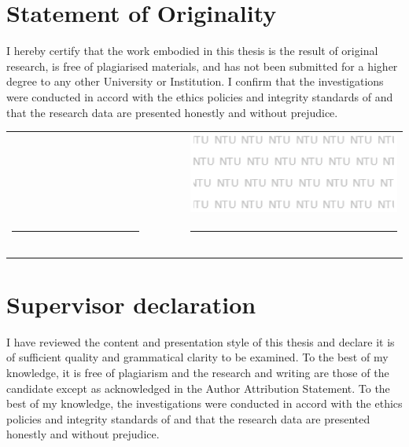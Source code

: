 
\newcommand*{\signaturetable}[1][default]{
  \begingroup
  \noindent
  \renewcommand{\arraystretch}{0} %
  \begin{tabular}{p{0.35\linewidth}p{0.1\linewidth}p{0.55\linewidth}}
    \makecell{\submissiondate \vspace{0.2cm}} &  & \includegraphics[width=\linewidth]{images/logos/ase_watermark.png} \\
    \hrule                                    &  & \hrule                                                             \\
    \makecell[t]{Date}                        &  & \makecell[t]{ #1 }                                                 \\
  \end{tabular}
  \endgroup
}

\chapter*{Statement of Originality}
I hereby certify that the work embodied in this thesis is the result of original research, is free of plagiarised materials, and has not been submitted for a higher degree to any other University or Institution. I confirm that the investigations were conducted in accord with the ethics policies and integrity standards of \schoolname and that the research data are presented honestly and without prejudice.
\vfill

\signaturetable[{
      \authorname \\ \deptname \\ \schoolname
    }]
\vspace{2cm}

\chapter*{Supervisor declaration}

I have reviewed the content and presentation style of this thesis and declare it is of sufficient quality and grammatical clarity to be examined.  To the best of my knowledge, it is free of plagiarism and the research and writing are those of the candidate except as acknowledged in the Author Attribution Statement. To the best of my knowledge, the investigations were conducted in accord with the ethics policies and integrity standards of \schoolname and that the research data are presented honestly and without prejudice.
\vfill


